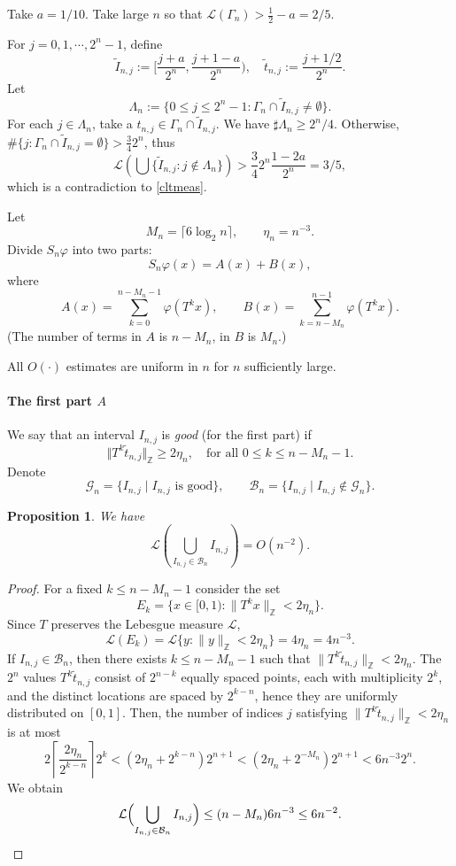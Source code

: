 \documentclass{amsart}
\newtheorem{prop}[thm]{Proposition}
\theoremstyle{definition}
\newcommand{\norm}[1]{\|#1\|}
\begin{document}
Take $a=1/10$. Take large $n$ so that $\mathcal{L}(\Gamma_n)>\frac{1}{2}-a=2/5$.

For $j=0,1,\cdots, 2^n-1$, define
$$\tilde{I}_{n,j}:=[\frac{j+a}{2^{n}},\frac{j+1-a}{2^{n}}),\quad 
\tilde{t}_{n,j}:=\frac{j+1/2}{2^n}.$$
Let 
$$\Lambda_n:=\{0\le j\le2^n-1 : \Gamma_n\cap\tilde{I}_{n,j}\ne\emptyset\}.$$
For each $j\in\Lambda_n$, take a $t_{n,j}\in \Gamma_n\cap\tilde{I}_{n,j}$.
We have $\sharp \Lambda_n\ge2^n/4$. 
Otherwise, $\#\{j:\Gamma_n\cap\tilde{I}_{n,j}=\emptyset\}>\frac342^n$, thus
$$\mathcal{L}\left(\bigcup\{\tilde{I}_{n,j}:j\not\in\Lambda_n \}\right)
>\frac{3}{4}2^n\frac{1-2a}{2^n}=3/5,$$
which is a contradiction to \eqref{cltmeas}.

Let
\[
M_n = \lceil 6\log_2 n\rceil ,\qquad \eta_n = n^{-3}.
\]
Divide $S_n \varphi$ into two parts:
\[
S_n \varphi(x)=A(x)+B(x),
\]
where
\[
A(x)=\sum_{k=0}^{n-M_n-1} \varphi(T^k x),\qquad
B(x)=\sum_{k=n-M_n}^{n-1} \varphi(T^k x).
\]
(The number of terms in $A$ is $n-M_n$, in $B$ is $M_n$.)

All $O(\cdot)$ estimates are uniform in $n$ for $n$ sufficiently large.

\smallskip
\paragraph{\textbf{The first part $A$}}

We say that
an interval $I_{n,j}$ is \emph{good} (for the first part) if
\[
\Vert{T^k \tilde{t}_{n,j}}\Vert_{\mathbb{Z}} \ge 2\eta_n,\quad\text{for all } 0\le k\le n-M_n-1.
\]
Denote
\[
\mathcal G_n = \{ I_{n,j}\mid I_{n,j} \text{ is good}\},\qquad
\mathcal B_n = \{ I_{n,j}\mid I_{n,j}\notin \mathcal G_n\}.
\]

\begin{prop}\label{prop:bad_measure}
We have
\[
\mathcal{L}\left(\bigcup_{I_{n,j}\in\mathcal B_n} I_{n,j}\right) = O(n^{-2}).
\]
\end{prop}
\begin{proof}
For a fixed $k\le n-M_n-1$ consider the set
\[
E_k = \{ x\in[0,1) : \norm{T^k x}_{\mathbb{Z}} < 2\eta_n \}.
\]
Since $T$ preserves the Lebesgue measure $\mathcal{L}$,
\[
\mathcal{L}(E_k) = \mathcal{L}\{ y : \norm{y}_{\mathbb{Z}} < 2\eta_n \} = 4\eta_n = 4n^{-3}.
\]
If $I_{n,j}\in\mathcal B_n$, then there exists $k\le n-M_n-1$ such that
$\norm{T^k \tilde{t}_{n,j}}_{\mathbb{Z}}<2\eta_n$.
The $2^n$ values ${T}^k\tilde{t}_{n,j}$
 consist of $2^{n-k}$ equally spaced points, each with multiplicity $2^k$, 
and the distinct locations are spaced by $2^{k-n}$, 
hence they are uniformly distributed on $[0,1]$.
Then, the number of indices $j$ satisfying 
$\norm{T^k \tilde{t}_{n,j}}_{\mathbb{Z}}<2\eta_n$ is at most
$$2\left\lceil\frac{2\eta_n}{2^{k-n}}\right\rceil 2^k
<(2\eta_n+2^{k-n})2^{n+1}<(2\eta_n+2^{-M_n})2^{n+1}<6n^{-3}2^n.$$
We obtain
\[
\mathcal{L}\Bigl(\bigcup_{I_{n,j}\in\mathcal B_n} I_{n,j}\Bigr)
\le (n-M_n)6n^{-3}
\le 6n^{-2}.
\]
\end{proof}
\end{document}
